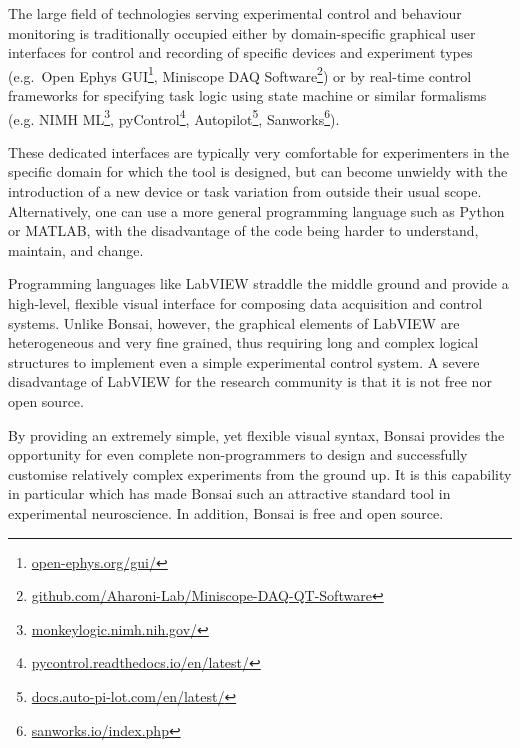 
The large field of technologies serving experimental control and behaviour
monitoring is traditionally occupied either by domain-specific graphical user
interfaces for control and recording of specific devices and experiment types
(e.g.\ Open Ephys GUI\footnote[16]{\url{open-ephys.org/gui/}}, Miniscope DAQ
Software\footnote[17]{\url{github.com/Aharoni-Lab/Miniscope-DAQ-QT-Software}}) or by
real-time control frameworks for specifying task logic using state machine or
similar formalisms (e.g. NIMH ML\footnote[18]{\url{monkeylogic.nimh.nih.gov/}},
pyControl\footnote[19]{\url{pycontrol.readthedocs.io/en/latest/}},
Autopilot\footnote[20]{\url{docs.auto-pi-lot.com/en/latest/}},
Sanworks\footnote[21]{\url{sanworks.io/index.php}}).

These dedicated interfaces are typically very comfortable for experimenters in
the specific domain for which the tool is designed, but can become unwieldy
with the introduction of a new device or task variation from outside their
usual scope.
%
Alternatively, one can use a more general programming language such as Python
or MATLAB, with the disadvantage of the code being harder to understand,
maintain, and change.

Programming languages like LabVIEW straddle the middle ground and provide a
high-level, flexible visual interface for composing data acquisition and
control systems. Unlike Bonsai, however, the graphical elements of LabVIEW are
heterogeneous and very fine grained, thus requiring long and complex logical
structures to implement even a simple experimental control system.
%
A severe disadvantage of LabVIEW for the research community is that it is not
free nor open source.

By providing an extremely simple, yet flexible visual syntax, Bonsai provides
the opportunity for even complete non-programmers to design and successfully
customise relatively complex experiments from the ground up. It is this
capability in particular which has made Bonsai such an attractive standard tool
in experimental neuroscience.
%
In addition, Bonsai is free and open source.

